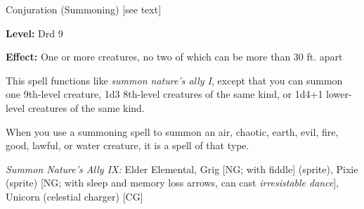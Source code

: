 
Conjuration (Summoning) [see text]

\textbf{Level:} Drd 9

\textbf{Effect:} One or more creatures, no two of which can be more than 30 ft. 
apart

This spell functions like \textit{summon nature's ally I}, except that you can 
summon one 9th-level creature, 1d3 8th-level creatures of the same kind, or 1d4+1 
lower-level creatures of the same kind.

When you use a summoning spell to summon an air, chaotic, earth, evil, fire, good, 
lawful, or water creature, it is a spell of that type.

\textit{Summon Nature's Ally IX:} Elder Elemental, Grig [NG; with fiddle] (sprite), Pixie (sprite) [NG; with sleep and memory loss arrows, can cast \textit{irresistable dance}], Unicorn (celestial charger) [CG]